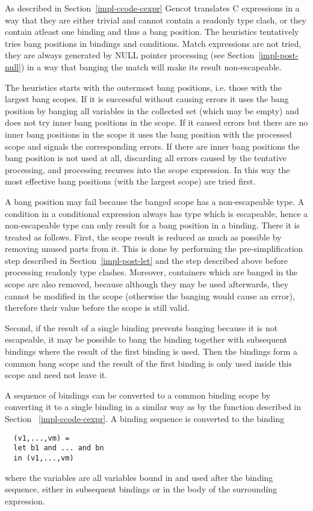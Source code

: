 As described in Section~\ref{impl-ccode-cexpr} Gencot translates C expressions in a way that they are either trivial and cannot
contain a readonly type clash, or they contain atleast one binding and thus a bang position. The heuristics tentatively tries
bang positions in bindings and conditions. Match expressions are not tried, they are always generated by NULL pointer processing
(see Section~\ref{impl-post-null}) in a way that banging the match will make its result non-escapeable.

The heuristics starts with the outermost bang positions, i.e. those with the largest bang scopes. If it is successful without
causing errors it uses the bang position by banging all variables in the collected set (which may be empty) and does not try
inner bang positions in the scope. If it caused errors but there are no inner bang positions in the scope it uses the bang
position with the processed scope and signals the corresponding errors. If there are inner bang positions the bang position
is not used at all, discarding all errors caused by the tentative processing, and processing recurses into the scope expression.
In this way the most effective bang positions (with the largest scope) are tried first.

A bang position may fail because the banged scope has a non-escapeable type. A condition in a conditional expression always
has type  which is escapeable, hence a non-escapeable type can only result for a bang position in a binding. There
it is treated as follows. First, the scope result is reduced as much as possible by removing unused parts from it.
This is done by performing the pre-simplification step  described in Section~\ref{impl-post-let} and the step
 described above before processing readonly type clashes. Moreover, containers which are banged in the scope
are also removed, because although they may be used afterwards, they cannot be modified in the scope (otherwise the banging
would cause an error), therefore their value before the scope is still valid.

Second, if the result of a single binding prevents banging because it is not escapeable, it may be possible to bang the binding
together with subsequent bindings where the result of the first binding is used. Then the bindings form a common bang scope
and the result of the first binding is only used inside this scope and need not leave it.

A sequence of bindings can be converted to a common binding scope by converting it to a single binding in a similar way as by
the function  described in Section ~\ref{impl-ccode-cexpr}. A binding sequence  is converted
to the binding
\begin{verbatim}
  (v1,...,vm) =
  let b1 and ... and bn
  in (v1,...,vm)
\end{verbatim}
where the variables  are all variables bound in  and used after the binding sequence, either
in subsequent bindings or in the body of the surrounding  expression.

